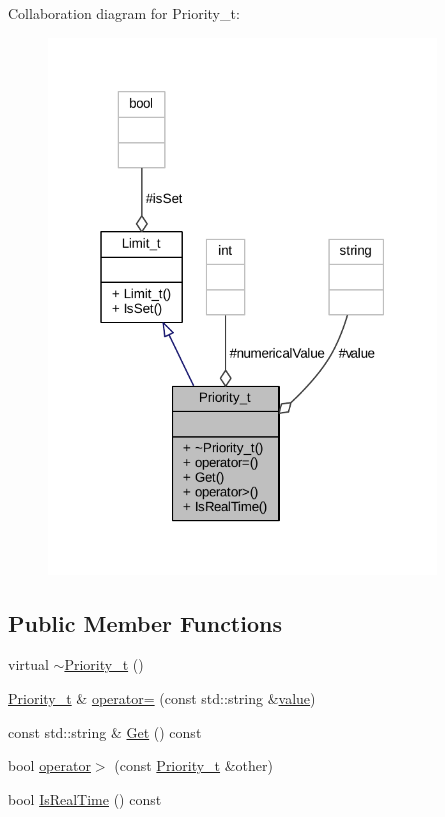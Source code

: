 Collaboration diagram for Priority\+\_\+t\+:
\nopagebreak
\begin{figure}[H]
\begin{center}
\leavevmode
\includegraphics[width=292pt]{class_priority__t__coll__graph}
\end{center}
\end{figure}
\subsection*{Public Member Functions}
\begin{DoxyCompactItemize}
\item 
virtual \hyperlink{class_priority__t_a05177a755c11bd051cec4140fc093264}{$\sim$\+Priority\+\_\+t} ()
\item 
\hyperlink{class_priority__t}{Priority\+\_\+t} \& \hyperlink{class_priority__t_a543bb4901fa6a5a3332f1e0bb6c37ab1}{operator=} (const std\+::string \&\hyperlink{class_priority__t_afd1c4aa37b795e472bed06e9b72aaa6e}{value})
\item 
const std\+::string \& \hyperlink{class_priority__t_a00c7e8d6b663966b5834bec834a5f37b}{Get} () const 
\item 
bool \hyperlink{class_priority__t_ad72d13a67db435421a0dcc05a1592572}{operator$>$} (const \hyperlink{class_priority__t}{Priority\+\_\+t} \&other)
\item 
bool \hyperlink{class_priority__t_a66fd2216c76b2eaec57f04b48d8b9f70}{Is\+Real\+Time} () const 
\end{DoxyCompactItemize}
